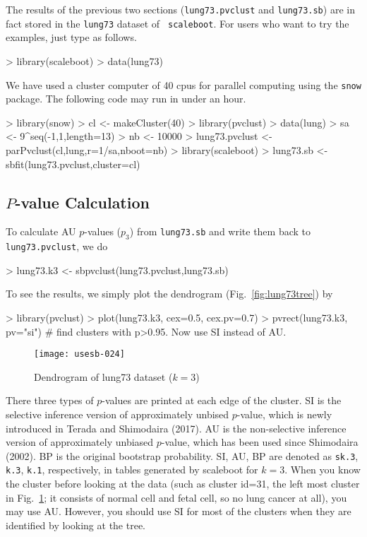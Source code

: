 \documentclass[a4paper]{amsart}
\begin{document}
The results of the previous two sections ({\tt lung73.pvclust} and
{\tt lung73.sb}) are in fact stored in the {\tt lung73} dataset of {\tt
scaleboot}. For users who want to try the examples, just type as follows.
\begin{Schunk}
\begin{Sinput}
> library(scaleboot)
> data(lung73)
\end{Sinput}
\end{Schunk}

We have used a cluster computer of 40 cpus for parallel
computing using the {\tt snow} package.
The following code may run in under an hour.
\begin{Schunk}
\begin{Sinput}
> library(snow)
> cl <- makeCluster(40)
> library(pvclust)
> data(lung)
> sa <- 9^seq(-1,1,length=13)
> nb <- 10000
> lung73.pvclust <- parPvclust(cl,lung,r=1/sa,nboot=nb)
> library(scaleboot)
> lung73.sb <- sbfit(lung73.pvclust,cluster=cl)
\end{Sinput}
\end{Schunk}

\subsection{$P$-value Calculation}

To calculate AU $p$-values ($p_3$) from {\tt lung73.sb} and write them
back to {\tt lung73.pvclust}, we do
\begin{Schunk}
\begin{Sinput}
> lung73.k3 <- sbpvclust(lung73.pvclust,lung73.sb)
\end{Sinput}
\end{Schunk}
To see the results, we simply plot the dendrogram
(Fig.~\ref{fig:lung73tree}) by
\begin{Schunk}
\begin{Sinput}
> library(pvclust)
> plot(lung73.k3, cex=0.5, cex.pv=0.7)
> pvrect(lung73.k3, pv="si") # find clusters with p>0.95. Now use SI instead of AU.
\end{Sinput}
\end{Schunk}
\begin{figure}
\begin{center}
\texttt{[image: usesb-024]}
\caption{Dendrogram of lung73 dataset ($k=3$)}\label{fig:lung73tree}
\label{fig:lung73-pvclust}
\end{center}
\end{figure}
There three types of $p$-values are printed at each edge of the cluster. SI is the selective inference version of approximately unbised $p$-value, which is newly introduced in Terada and Shimodaira (2017). AU is the non-selective inference version of approximately unbiased $p$-value, which has been used since Shimodaira (2002). BP is the original bootstrap probability. SI, AU, BP are denoted as {\tt sk.3}, {\tt k.3}, {\tt k.1}, respectively, in tables generated by scaleboot for $k=3$.
When you know the cluster before looking at the data (such as cluster id=31, the left most cluster in Fig.~\ref{fig:lung73-pvclust}; it consists of normal cell and fetal cell, so no lung cancer at all), you may use AU.
However, you should use SI for most of the clusters when they are identified by looking at the tree.
\end{document}
